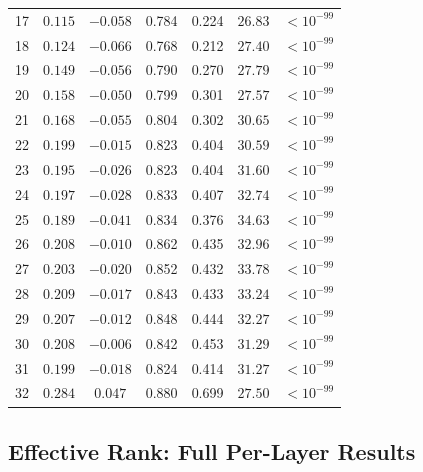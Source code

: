 \documentclass{article}
\begin{document}
\begin{longtable}{c cc cc r c}
17 &  $0.115$ & $-0.058$ & 0.784 & 0.224 &  $26.83$ & $<10^{-99}$ \\
18 &  $0.124$ & $-0.066$ & 0.768 & 0.212 &  $27.40$ & $<10^{-99}$ \\
19 &  $0.149$ & $-0.056$ & 0.790 & 0.270 &  $27.79$ & $<10^{-99}$ \\
20 &  $0.158$ & $-0.050$ & 0.799 & 0.301 &  $27.57$ & $<10^{-99}$ \\
21 &  $0.168$ & $-0.055$ & 0.804 & 0.302 &  $30.65$ & $<10^{-99}$ \\
22 &  $0.199$ & $-0.015$ & 0.823 & 0.404 &  $30.59$ & $<10^{-99}$ \\
23 &  $0.195$ & $-0.026$ & 0.823 & 0.404 &  $31.60$ & $<10^{-99}$ \\
24 &  $0.197$ & $-0.028$ & 0.833 & 0.407 &  $32.74$ & $<10^{-99}$ \\
25 &  $0.189$ & $-0.041$ & 0.834 & 0.376 &  $34.63$ & $<10^{-99}$ \\
26 &  $0.208$ & $-0.010$ & 0.862 & 0.435 &  $32.96$ & $<10^{-99}$ \\
27 &  $0.203$ & $-0.020$ & 0.852 & 0.432 &  $33.78$ & $<10^{-99}$ \\
28 &  $0.209$ & $-0.017$ & 0.843 & 0.433 &  $33.24$ & $<10^{-99}$ \\
29 &  $0.207$ & $-0.012$ & 0.848 & 0.444 &  $32.27$ & $<10^{-99}$ \\
30 &  $0.208$ & $-0.006$ & 0.842 & 0.453 &  $31.29$ & $<10^{-99}$ \\
31 &  $0.199$ & $-0.018$ & 0.824 & 0.414 &  $31.27$ & $<10^{-99}$ \\
32 &  $0.284$ &  $0.047$ & 0.880 & 0.699 &  $27.50$ & $<10^{-99}$ \\
\end{longtable}

\subsection{Effective Rank: Full Per-Layer Results}
\label{app:eff_rank_full}
\end{document}
